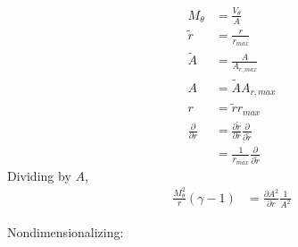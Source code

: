 \begin{align*}
    M_{\theta} &= \frac{V_{\theta}}{A} \\ 
    \widetilde{r} &= \frac{r}{r_{max}}  \\
    \widetilde{A} &= \frac{A}{A_{r,max}}  \\
    A &= \widetilde{A}{A_{r,max}} \\
    r &= \widetilde{r}{r_{max}}\\
    \frac{\partial}{\partial r} &=
    \frac{\partial \widetilde{r}}{\partial r} \frac{\partial}{\partial \widetilde{r}}\\
                                &= \frac{1}{r_{max}}\frac{\partial}{\partial \widetilde{r}}
\end{align*}
Dividing by $A$,
\begin{align*}
    \frac{M_{\theta}^2}{r}\left(\gamma - 1\right) 
&= \frac{\partial A^2}{\partial r} \frac{1}{A^2}
\end{align*}

%
Nondimensionalizing:

